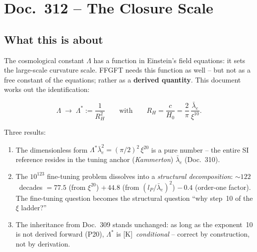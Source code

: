 \maketitle
\tableofcontents

\chapter*{Doc.~312 -- The Closure Scale}

\section*{What this is about}

The cosmological constant $\Lambda$ has a function in Einstein's
field equations: it sets the large-scale curvature scale. FFGFT needs
this function as well -- but not as a free constant of the equations;
rather as a \textbf{derived quantity}. This document works out the
identification:

\[
  \Lambda \;\longrightarrow\; \Lambda^{*} := \frac{1}{R_H^2}
  \qquad\text{with}\qquad
  R_H = \frac{c}{H_0} = \frac{2}{\pi}\,\frac{\bar\lambda_e}{\xi^{10}}.
\]

Three results:
\begin{enumerate}
  \item The dimensionless form
        $\Lambda^{*}\bar\lambda_e^{2} = (\pi/2)^{2}\,\xi^{20}$
        is a pure number -- the entire SI reference resides in the
        tuning anchor (\emph{Kammerton}) $\bar\lambda_e$ (Doc.~310).
  \item The $10^{123}$ fine-tuning problem dissolves into a
        \emph{structural decomposition}: $\sim\!122$~decades
        $= 77.5$ (from $\xi^{20}$) $+\,44.8$ (from
        $(l_P/\bar\lambda_e)^2$) $-\,0.4$ (order-one factor). The
        fine-tuning question becomes the structural question
        \enquote{why step~10 of the $\xi$ ladder?}
  \item The inheritance from Doc.~309 stands unchanged: as long as
        the exponent~10 is not derived forward (P20), $\Lambda^{*}$
        is [K]~\emph{conditional} -- correct by construction, not by
        derivation.
\end{enumerate}

